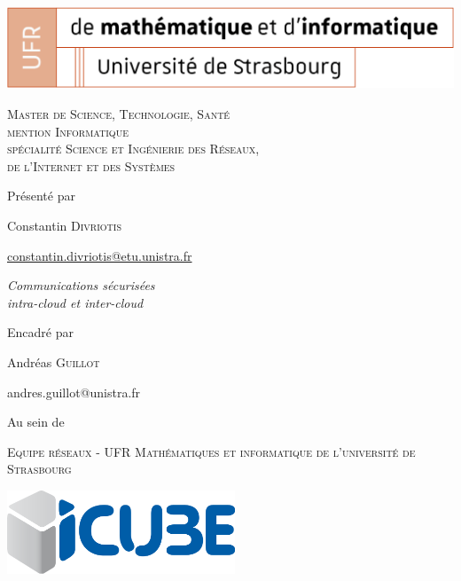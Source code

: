\thispagestyle{empty}

\begin{center}
	\noindent
	\includegraphics[height=2.5cm]{./pics/logo_ufr.png}       
	
	\vfill\vfill
	
	{\large \textsc{Master de Science, Technologie, Santé \\mention Informatique\\spécialité Science et Ingénierie des Réseaux,\\de l'Internet et des Systèmes}}
	
	\bigskip\bigskip
	
	{\large Présenté par}
	
	\medskip
	
	{\large Constantin \textsc{Divriotis}}
	
	{\small \url{constantin.divriotis@etu.unistra.fr}}
	
	\vfill\vfill
	
	{\huge \sc
		\begin{center}
			\textit{Communications sécurisées\\intra-cloud et inter-cloud}
	\end{center}}
	
	\vfill\vfill
	
	{\large Encadré par}
	
	\medskip
	
	{\large Andréas \textsc{Guillot}}
	
	{\small andres.guillot@unistra.fr}
	
	\bigskip
	
	{\large Au sein de}
	
	\medskip
	
	{\large \textsc{Equipe réseaux - UFR Mathématiques et informatique de l'université de Strasbourg}}
	
	\vfill\vfill\vfill
	
	\includegraphics[height=2.5cm]{./pics/icube.pdf}       
	
\end{center}